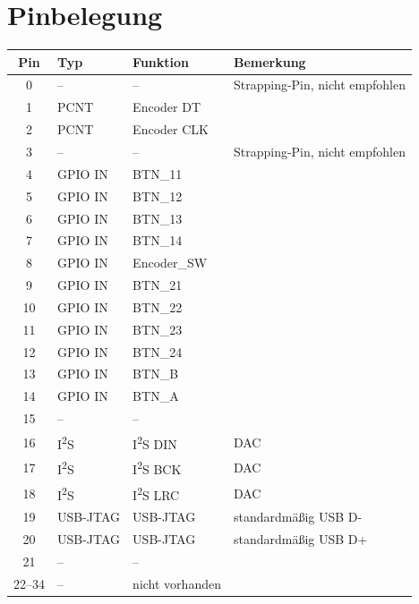 \section{Pinbelegung}
\label{sec:pinout}
\begin{table}[H]
    \centering
    \begin{tabular}{c|l|l|l}
        \textbf{Pin} & \textbf{Typ} & \textbf{Funktion} & \textbf{Bemerkung} \\
        \hline
        0  & --        & --              & Strapping-Pin, nicht empfohlen \\
        1  & PCNT      & Encoder DT      & \\
        2  & PCNT      & Encoder CLK     & \\
        3  & --        & --              & Strapping-Pin, nicht empfohlen \\
        4  & GPIO IN   & BTN\_11         & \\
        5  & GPIO IN   & BTN\_12         & \\
        6  & GPIO IN   & BTN\_13         & \\
        7  & GPIO IN   & BTN\_14         & \\
        8  & GPIO IN   & Encoder\_SW     & \\
        9  & GPIO IN   & BTN\_21         & \\
        10 & GPIO IN   & BTN\_22         & \\
        11 & GPIO IN   & BTN\_23         & \\
        12 & GPIO IN   & BTN\_24         & \\
        13 & GPIO IN   & BTN\_B          & \\
        14 & GPIO IN   & BTN\_A          & \\
        15 & --        & --              & \\
        16 & I\textsuperscript{2}S & I\textsuperscript{2}S DIN & DAC \\
        17 & I\textsuperscript{2}S & I\textsuperscript{2}S BCK & DAC \\
        18 & I\textsuperscript{2}S & I\textsuperscript{2}S LRC & DAC \\
        19 & USB-JTAG  & USB-JTAG        & standardmäßig USB D- \\
        20 & USB-JTAG  & USB-JTAG        & standardmäßig USB D+ \\
        21 & --        & --              & \\
        \hline
        22--34 & --     & nicht vorhanden & \\

\end{tabular}
\end{table}
